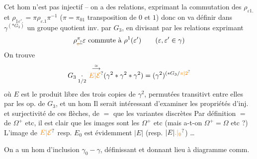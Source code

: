 Cet hom n'est pas injectif -- on a des relations,   exprimant la commutation des $\rho_{\varepsilon1.}$ et $\rho_{1\varepsilon'.}=\pi\rho_{\varepsilon.1}\pi^{-1}$ ($\pi=\pi_{01}$ transposition de $0$ et $1$) donc on va définir dans $\gamma^{(*G_3)}$ un groupe quotient inv. par $G_3$, en divisant par les relations exprimant
\[
\rho^{\pi}_{\deleted{\unsure{\varepsilon}}}\varepsilon\ \text{commute à}\ \rho^1(\varepsilon')\qquad
(\varepsilon,\varepsilon'\in\gamma)
\]
On trouve
\[
G_3\underset{1/2}{\cdot}\,\overset{\overset{\simeq}{\longrightarrow}}{\unsure{E|\mathcal E}}
(\gamma^2*\gamma^2*\gamma^2)=(\gamma^2)^{(*G_3/\unsure{\pi|2}}
\]
où $E$ est le produit libre  des trois copies de $\gamma^2$, permutées transitivt entre elles par les op. de $G_3$, et un hom
Il serait intéressant d'examiner les propriétés d'inj. et surjectivité de ces flèches, de $=$ que les variantes discrètes
Par définition $=$ de $\Omega^+$ etc, il est clair que les images sont les $\Omega^+$ etc (mais a-t-on $\Omega^+=\Omega$ etc ?)  L'image de $\unsure{E|\mathcal E}$ resp. $E_0$ est évidemment $|E|$ (resp. $|E|\unsure{.|{}_0}$) \ldots

On a un hom d'inclusion $\gamma_0\mathbin{-}\gamma$, définissant
et donnant lieu à diagramme comm.

